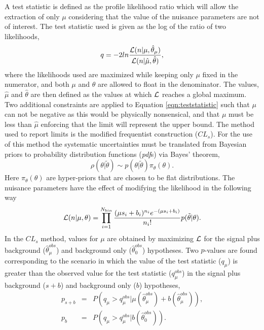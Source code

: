 A test statistic is defined as the profile likelihood ratio which will allow the extraction of only $\mu$ considering that the value of the nuisance parameters are not of interest.
The test statistic used is given as the log of the ratio of two likelihoods,
\begin{equation}
\label{eqn:teststatistic}
q = -2 ln\frac{\mathcal{L}(n|\mu,\hat{\theta}_{\mu})}{\mathcal{L}(n|\hat{\mu},\hat{\theta})},
\end{equation}
where the likelihoods used are maximized while keeping only $\mu$ fixed in the numerator, and both $\mu$ and $\theta$ are allowed to float in the denominator.
The values, $\hat{\mu}$ and $\hat{\theta}$ are then defined as the values at which $\mathcal{L}$ reaches a global maximum.
Two additional constraints are applied to Equation \ref{eqn:teststatistic} such that $\mu$ can not be negative as this would be physically nonsensical, and that $\mu$ must be less than $\hat{\mu}$ enforcing that the limit will represent the upper bound.
The method used to report limits is the modified frequentist construction ($CL_{s}$). 
For the use of this method the systematic uncertainties must be translated from Bayesian priors to probability distribution functions (\emph{pdf}s) via Bayes' theorem,
\begin{equation}
\rho(\theta|\tilde{\theta}) \sim p(\theta|\tilde{\theta})\pi_{\theta}(\theta).
\end{equation}
Here $\pi_{\theta}(\theta)$ are hyper-priors that are chosen to be flat distributions.
The nuisance parameters have the effect of modifying the likelihood in the following way
\begin{equation}
\mathcal{L}(n|\mu, \theta) = \prod_{i=1}^{N_{bin}} \frac{(\mu s_{i} + b_{i})^{n_{i}}e^{-(\mu s_{i}+b_{i})}}{n_{i}!} p(\tilde{\theta}|\theta).
\end{equation}
In the $CL_{s}$ method, values for $\mu$ are obtained by maximizing $\mathcal{L}$ for the signal plus background ($\hat{\theta}_{\mu}^{obs}$) and background only ($\hat{\theta}_{0}^{obs}$) hypotheses.
Two $p$-values are found corresponding to the scenario in which the value of the test statistic ($q_{\mu}$) is greater than the observed value for the test statistic ($q_{\mu}^{obs}$) in the signal plus background ($s+b$) and background only ($b$) hypotheses,
\begin{eqnarray*}
p_{s+b} & = & P\left(q_{\mu} > q_{\mu}^{obs}|\mu(\hat{\theta}_{\mu}^{obs}) + b(\hat{\theta}_{\mu}^{obs})\right), \\
p_{b}   & = & P\left(q_{\mu} > q_{\mu}^{obs}|b(\hat{\theta}_{0}^{obs})\right).
\end{eqnarray*}
